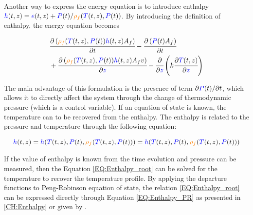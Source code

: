 \documentclass[../Article_Model_Parameters.tex]{subfiles}
\begin{document}
			Another way to express the energy equation is to introduce enthalpy ${\color{blue}h}(t,z) = {\color{blue}e}(t,z) + {\color{blue}P}(t) / {\color{orange}\rho_f}({\color{blue}T}(t,z),{\color{blue}P}(t))$. By introducing the definition of enthalpy, the energy equation becomes
			
			{\footnotesize
				\begin{align} \label{EQ:Enthalpy_equation}
					&\cfrac{\partial \left({\color{orange}\rho_f}({\color{blue}T}(t,z),{\color{blue}P}(t)) {\color{blue}h}(t,z) A_f\right)}{\partial t} - \cfrac{\partial \left({\color{blue}P}(t) A_f\right)}{\partial t} \nonumber \\
					&+ \cfrac{\partial \left( {\color{orange}\rho_f}({\color{blue}T}(t,z),{\color{blue}P}(t)) {\color{blue}h}(t,z) A_f v \right)}{\partial {\color{blue}z}} - \cfrac{\partial}{\partial {\color{blue}z}} \left( k \cfrac{\partial {\color{blue}T}(t,z)}{\partial {\color{blue}z}} \right)
				\end{align}
			}
		
			The main advantage of this formulation is the presence of term $\partial {\color{blue}P}(t) / \partial t $, which allows it to directly affect the system through the change of thermodynamic pressure (which is a control variable). If an equation of state is known, the temperature can to be recovered from the enthalpy. The enthalpy is related to the pressure and temperature through the following equation:
			
			{\footnotesize
				\begin{equation}
					{\color{blue}h}(t,z)={\color{blue}h}({\color{blue}T}(t,z),{\color{blue}P}(t),{\color{orange}\rho_f}({\color{blue}T}(t,z),{\color{blue}P}(t)))={\color{blue}h}( {\color{blue}T}(t,z),{\color{blue}P}(t), {\color{orange}\rho_f}({\color{blue}T}(t,z),{\color{blue}P}(t)) ) 
					\label{EQ:Enthalpy_root}
				\end{equation}
			}
		
			If the value of enthalpy is known from the time evolution and pressure can be measured, then the Equation \ref{EQ:Enthalpy_root} can be solved for the temperature to recover the temperature profile. By applying the departure functions to Peng-Robinson equation of state, the relation \ref{EQ:Enthalpy_root} can be expressed directly through Equation \ref{EQ:Enthalpy_PR} as presented in \ref{CH:Enthalpy} or given by \citet{Gmehling2019}.
			
\end{document}
